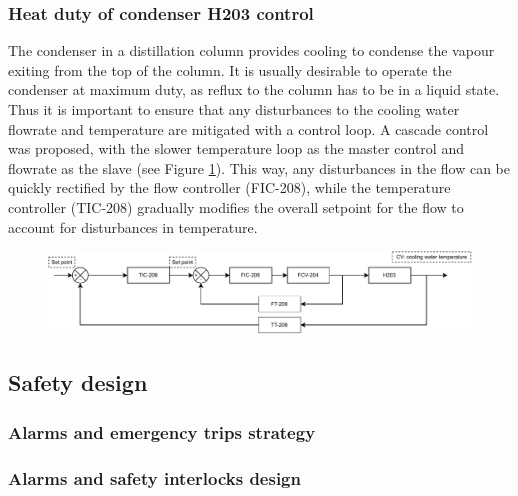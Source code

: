 \subsubsection{Heat duty of condenser H203 control}%
The condenser in a distillation column provides cooling to condense the vapour exiting from the top of the column. It is usually desirable to operate the condenser at maximum duty, as reflux to the column has to be in a liquid state. Thus it is important to ensure that any disturbances to the cooling water flowrate and temperature are mitigated with a control loop. A cascade control was proposed, with the slower temperature loop as the master control and flowrate as the slave (see Figure \ref{fig:S203C-TC}). This way, any disturbances in the flow can be quickly rectified by the flow controller (FIC-208), while the temperature controller (TIC-208) gradually modifies the overall setpoint for the flow to account for disturbances in temperature.

\begin{figure}[H]
    \centering
    \includegraphics[width=0.8\linewidth]{chapters/4-operation-control/4-Figures/H203-TC.pdf}
    \caption{}
    \label{fig:S203C-TC}
\end{figure}



\subsection{Safety design}

\subsubsection{Alarms and emergency trips strategy}

\subsubsection{Alarms and safety interlocks design}